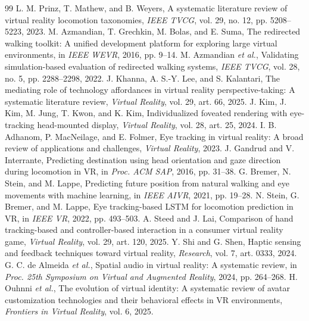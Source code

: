 \begin{thebibliography}{99}
 L. M. Prinz, T. Mathew, and B. Weyers, A systematic literature review of virtual reality locomotion taxonomies, \emph{IEEE TVCG}, vol. 29, no. 12, pp. 5208--5223, 2023.
 M. Azmandian, T. Grechkin, M. Bolas, and E. Suma, The redirected walking toolkit: A unified development platform for exploring large virtual environments, in \emph{IEEE WEVR}, 2016, pp. 9--14.
 M. Azmandian \emph{et al.}, Validating simulation-based evaluation of redirected walking systems, \emph{IEEE TVCG}, vol. 28, no. 5, pp. 2288--2298, 2022.
 J. Khanna, A. S.-Y. Lee, and S. Kalantari, The mediating role of technology affordances in virtual reality perspective-taking: A systematic literature review, \emph{Virtual Reality}, vol. 29, art. 66, 2025.
 J. Kim, J. Kim, M. Jung, T. Kwon, and K. Kim, Individualized foveated rendering with eye-tracking head-mounted display, \emph{Virtual Reality}, vol. 28, art. 25, 2024.
 I. B. Adhanom, P. MacNeilage, and E. Folmer, Eye tracking in virtual reality: A broad review of applications and challenges, \emph{Virtual Reality}, 2023.
 J. Gandrud and V. Interrante, Predicting destination using head orientation and gaze direction during locomotion in VR, in \emph{Proc. ACM SAP}, 2016, pp. 31--38.
 G. Bremer, N. Stein, and M. Lappe, Predicting future position from natural walking and eye movements with machine learning, in \emph{IEEE AIVR}, 2021, pp. 19--28.
 N. Stein, G. Bremer, and M. Lappe, Eye tracking-based LSTM for locomotion prediction in VR, in \emph{IEEE VR}, 2022, pp. 493--503.
 A. Steed and J. Lai, Comparison of hand tracking-based and controller-based interaction in a consumer virtual reality game, \emph{Virtual Reality}, vol. 29, art. 120, 2025.
 Y. Shi and G. Shen, Haptic sensing and feedback techniques toward virtual reality, \emph{Research}, vol. 7, art. 0333, 2024.
 G. C. de Almeida \emph{et al.}, Spatial audio in virtual reality: A systematic review, in \emph{Proc. 25th Symposium on Virtual and Augmented Reality}, 2024, pp. 264--268.
 H. Ouhnni \emph{et al.}, The evolution of virtual identity: A systematic review of avatar customization technologies and their behavioral effects in VR environments, \emph{Frontiers in Virtual Reality}, vol. 6, 2025.

\end{thebibliography}
